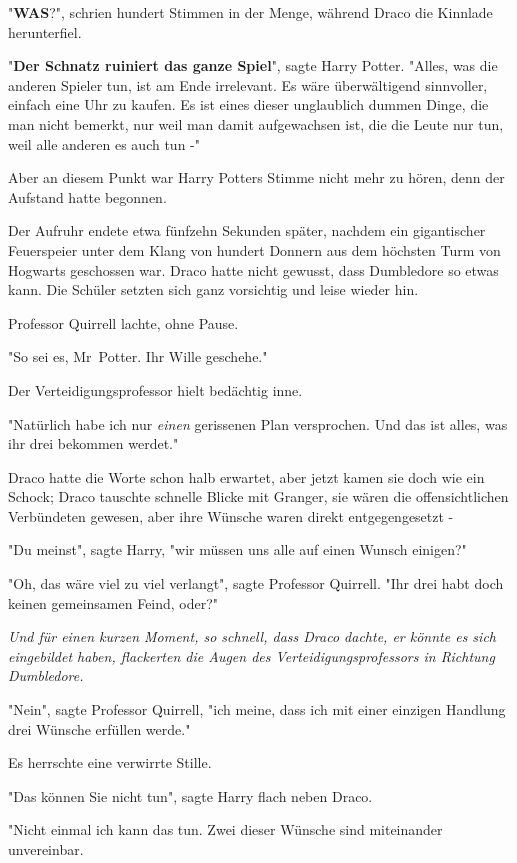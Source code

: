 {"\textbf{WAS}?", schrien hundert Stimmen in der Menge, während Draco die Kinnlade herunterfiel.

"\textbf{Der Schnatz ruiniert das ganze Spiel}", sagte Harry Potter. "Alles, was die anderen Spieler tun, ist am Ende irrelevant. Es wäre überwältigend sinnvoller, einfach eine Uhr zu kaufen. Es ist eines dieser unglaublich dummen Dinge, die man nicht bemerkt, nur weil man damit aufgewachsen ist, die die Leute nur tun, weil alle anderen es auch tun -"

Aber an diesem Punkt war Harry Potters Stimme nicht mehr zu hören, denn der Aufstand hatte begonnen.

Der Aufruhr endete etwa fünfzehn Sekunden später, nachdem ein gigantischer Feuerspeier unter dem Klang von hundert Donnern aus dem höchsten Turm von Hogwarts geschossen war. Draco hatte nicht gewusst, dass Dumbledore so etwas kann. Die Schüler setzten sich ganz vorsichtig und leise wieder hin.

Professor Quirrell lachte, ohne Pause.

"So sei es, Mr~Potter. Ihr Wille geschehe."

Der Verteidigungsprofessor hielt bedächtig inne.

"Natürlich habe ich nur \emph{einen} gerissenen Plan versprochen. Und das ist alles, was ihr drei bekommen werdet."

Draco hatte die Worte schon halb erwartet, aber jetzt kamen sie doch wie ein Schock; Draco tauschte schnelle Blicke mit Granger, sie wären die offensichtlichen Verbündeten gewesen, aber ihre Wünsche waren direkt entgegengesetzt -

"Du meinst", sagte Harry, "wir müssen uns alle auf einen Wunsch einigen?"

"Oh, das wäre viel zu viel verlangt", sagte Professor Quirrell. "Ihr drei habt doch keinen gemeinsamen Feind, oder?"

\emph{Und für einen kurzen Moment, so schnell, dass Draco dachte, er könnte es sich eingebildet haben, flackerten die Augen des Verteidigungsprofessors in Richtung Dumbledore.}

"Nein", sagte Professor Quirrell, "ich meine, dass ich mit einer einzigen Handlung drei Wünsche erfüllen werde."

Es herrschte eine verwirrte Stille.

"Das können Sie nicht tun", sagte Harry flach neben Draco.

"Nicht einmal ich kann das tun. Zwei dieser Wünsche sind miteinander unvereinbar.

}
